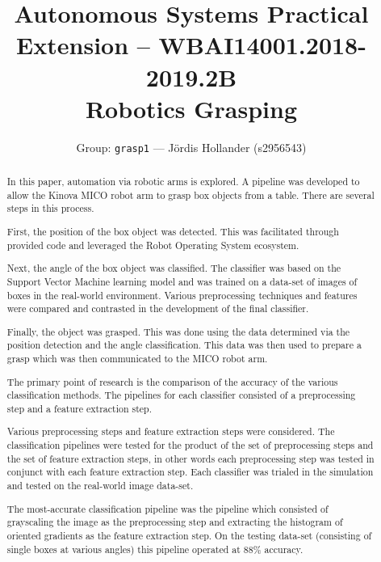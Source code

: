 \documentclass[letterpaper, 10 pt, conference]{conf/ieeeconf}  %
\title{\LARGE \bf
  Autonomous Systems Practical Extension -- WBAI14001.2018-2019.2B \\
  Robotics Grasping
}
\author{Group: \texttt{grasp1} --- J\"{o}rdis Hollander (s2956543)}
\begin{document}
\maketitle
\thispagestyle{empty}
\pagestyle{empty}


\begin{abstract}
  In this paper, automation via robotic arms is explored. A pipeline was developed
  to allow the Kinova MICO robot arm to grasp box objects from a table. There
  are several steps in this process.

  First, the position of the box object was detected. This was facilitated
  through provided code and leveraged the Robot Operating System ecosystem.

  Next, the angle of the box object was classified. The classifier was based on
  the Support Vector Machine learning model and was trained on a data-set of
  images of boxes in the real-world environment. Various preprocessing techniques
  and features were compared and contrasted in the development of the final
  classifier.

  Finally, the object was grasped. This was done using the data determined via
  the position detection and the angle classification. This data was then used to
  prepare a grasp which was then communicated to the MICO robot arm.

  The primary point of research is the comparison of the accuracy of the various
  classification methods. The pipelines for each classifier consisted of a
  preprocessing step and a feature extraction step.

  Various preprocessing steps and feature extraction steps were considered. The
  classification pipelines were tested for the product of the set of preprocessing
  steps and the set of feature extraction steps, in other words each preprocessing
  step was tested in conjunct with each feature extraction step. Each classifier
  was trialed in the simulation and tested on the real-world image data-set.

  The most-accurate classification pipeline was the pipeline which consisted of
  grayscaling the image as the preprocessing step and extracting the histogram of
  oriented gradients as the feature extraction step. On the testing data-set
  (consisting of single boxes at various angles) this pipeline operated at 88\%
  accuracy.
\end{abstract}
\end{document}
